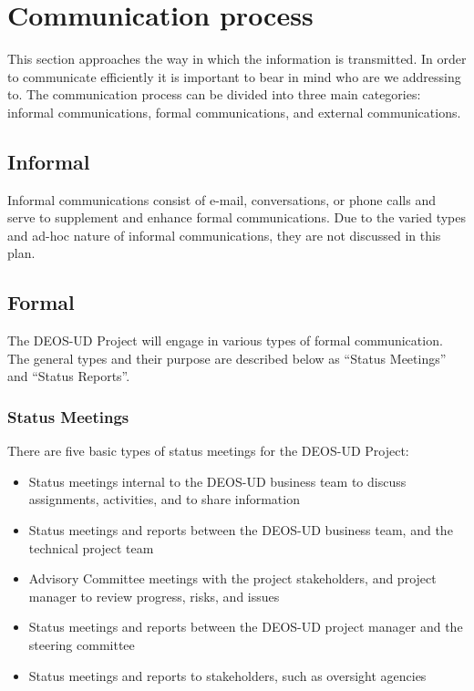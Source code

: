 \section{Communication process}

This section approaches the way in which the information is transmitted. In order to communicate efficiently it is important to bear in mind who are we addressing to. The communication process can be divided into three main categories: informal communications, formal communications, and external communications.  

\subsection{Informal}

Informal communications consist of e-mail, conversations, or phone calls and serve to supplement and enhance formal communications. Due to the varied types and ad-hoc nature of informal communications, they are not discussed in this plan.

\subsection{Formal}

The DEOS-UD Project will engage in various types of formal communication. The general types and their purpose are described below as “Status Meetings” and “Status Reports”.

\subsubsection{Status Meetings}

There are five basic types of status meetings for the DEOS-UD Project:
 \begin{itemize}
	\item Status meetings internal to the DEOS-UD business team to discuss assignments, activities, and to share information
	\item Status meetings and reports between the DEOS-UD business team, and the technical project team
	\item Advisory Committee meetings with the project stakeholders, and project manager to review progress, risks, and issues
	\item Status meetings and reports between the DEOS-UD project manager and the steering committee
	\item Status meetings and reports to stakeholders, such as oversight agencies
 \end{itemize}

